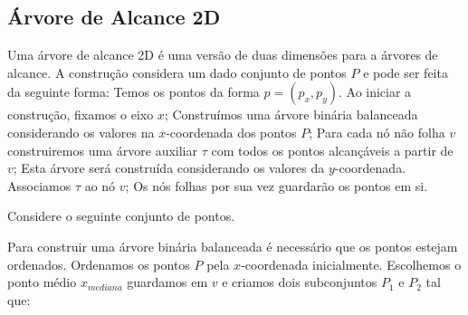 \subsection{Árvore de Alcance 2D}

Uma árvore de alcance 2D é uma versão de duas dimensões para a árvores de alcance. A construção considera
um dado conjunto de pontos $P$ e pode ser feita da seguinte forma:
Temos os pontos da forma $p = (p_x, p_y)$. Ao iniciar a construção, fixamos o eixo $x$;
Construímos uma árvore binária balanceada considerando os valores na $x$-coordenada dos pontos $P$;
Para cada nó não folha $v$ construiremos uma árvore auxiliar $\tau$ com todos os pontos alcançáveis 
a partir de $v$; Esta árvore será construída considerando os valores da $y$-coordenada. Associamos 
$\tau$ ao nó $v$; Os nós folhas por sua vez guardarão os pontos em si.

Considere o seguinte conjunto de pontos.
\begin{figure}[H]


\end{figure}

Para construir uma árvore binária balanceada é necessário que os pontos estejam ordenados.
Ordenamos os pontos $P$ pela $x$-coordenada inicialmente. Escolhemos o ponto médio $x_{mediana}$ guardamos
em $v$ e criamos dois subconjuntos $P_1$ e $P_2$ tal que:


